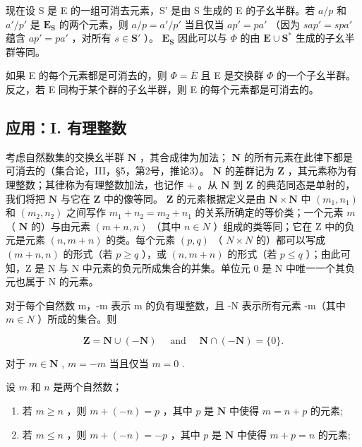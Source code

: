 现在设 S 是 E 的一组可消去元素，S' 是由 S 生成的 E 的子幺半群。若 \(a/p\) 和 \(a'/p'\) 是 \(\mathbf{E}_{\mathbf{S}}\) 的两个元素，则 \(a/p = a'/p'\) 当且仅当 \(ap' = pa'\) （因为 \(sap' = spa'\) 蕴含 \(ap' = pa'\) ，对所有 \(s \in \mathbf{S}'\) ）。 \(\mathbf{E}_{\mathbf{S}}\) 因此可以与 \(\Phi\) 的由 \(\mathbf{E} \cup \mathbf{S}^*\) 生成的子幺半群等同。

如果 E 的每个元素都是可消去的，则 \(\Phi = \bar{E}\) 且 E 是交换群 \(\Phi\) 的一个子幺半群。反之，若 E 同构于某个群的子幺半群，则 E 的每个元素都是可消去的。

\subsection{应用：I. 有理整数}

考虑自然数集的交换幺半群 \(\mathbf{N}\) ，其合成律为加法； \(\mathbf{N}\) 的所有元素在此律下都是可消去的（集合论，III，§5，第2号，推论3）。 \(\mathbf{N}\) 的差群记为 \(\mathbf{Z}\) ，其元素称为有理整数；其律称为有理整数加法，也记作 \(+\) 。从 \(\mathbf{N}\) 到 \(\mathbf{Z}\) 的典范同态是单射的，我们将把 \(\mathbf{N}\) 与它在 \(\mathbf{Z}\) 中的像等同。 \(\mathbf{Z}\) 的元素根据定义是由 \(\mathbf{N} \times \mathbf{N}\) 中 \((m_1, n_1)\) 和 \((m_2, n_2)\) 之间写作 \(m_1 + n_2 = m_2 + n_1\) 的关系所确定的等价类；一个元素 \(m\) （ \(\mathbf{N}\) 的）与由元素 \((m + n, n)\) （其中 \(n \in N\) ）组成的类等同；它在 Z 中的负元是元素 \((n, m + n)\) 的类。每个元素 \((p, q)\) （ \(N \times N\) 的）都可以写成 \((m + n, n)\) 的形式（若 \(p \geqslant q\) ），或 \((n, m + n)\) 的形式（若 \(p \leqslant q\) ）；由此可知，Z 是 N 与 N 中元素的负元所成集合的并集。单位元 0 是 N 中唯一一个其负元也属于 N 的元素。

对于每个自然数 m，-m 表示 m 的负有理整数，且 -N 表示所有元素 -m（其中 \(m \in N\) ）所成的集合。则

\[
\mathbf {Z} = \mathbf {N} \cup (- \mathbf {N}) \quad \text { and } \quad \mathbf {N} \cap (- \mathbf {N}) = \{0 \}.
\]

对于 \(m \in \mathbf{N}\) , \(m = -m\) 当且仅当 \(m = 0\) .

设 \(m\) 和 \(n\) 是两个自然数；

\begin{enumerate}
\def\labelenumi{(\alph{enumi})}
\item
  若 \(m \geqslant n\) ，则 \(m + (-n) = p\) ，其中 \(p\) 是 \(\mathbf{N}\) 中使得 \(m = n + p\) 的元素;
\item
  若 \(m \leqslant n\) ，则 \(m + (-n) = -p\) ，其中 \(p\) 是 \(\mathbf{N}\) 中使得 \(m + p = n\) 的元素;
\end{enumerate}

